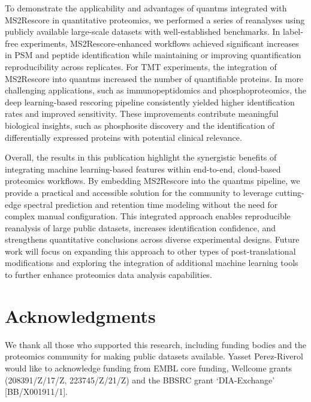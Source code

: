 \documentclass[12pt]{article}
\begin{document}
To demonstrate the applicability and advantages of quantms integrated with MS2Rescore in quantitative proteomics, we performed a series of reanalyses using publicly available large-scale datasets with well-established benchmarks. In label-free experiments, MS2Rescore-enhanced workflows achieved significant increases in PSM and peptide identification while maintaining or improving quantification reproducibility across replicates. For TMT experiments, the integration of MS2Rescore into quantms increased the number of quantifiable proteins. In more challenging applications, such as immunopeptidomics and phosphoproteomics, the deep learning-based rescoring pipeline consistently yielded higher identification rates and improved sensitivity. These improvements contribute meaningful biological insights, such as phosphosite discovery and the identification of differentially expressed proteins with potential clinical relevance.

Overall, the results in this publication highlight the synergistic benefits of integrating machine learning-based features within end-to-end, cloud-based proteomics workflows. By embedding MS2Rescore into the quantms pipeline, we provide a practical and accessible solution for the community to leverage cutting-edge spectral prediction and retention time modeling without the need for complex manual configuration. This integrated approach enables reproducible reanalysis of large public datasets, increases identification confidence, and strengthens quantitative conclusions across diverse experimental designs. Future work will focus on expanding this approach to other types of post-translational modifications and exploring the integration of additional machine learning tools to further enhance proteomics data analysis capabilities.

\section*{Acknowledgments}
We thank all those who supported this research, including funding bodies and the proteomics community for making public datasets available. 
Yasset Perez-Riverol would like to acknowledge funding from EMBL core funding, Wellcome grants (208391/Z/17/Z, 223745/Z/21/Z) and the BBSRC grant ‘DIA-Exchange’ [BB/X001911/1].


\renewcommand\thefigure{S\arabic{figure}}
\setcounter{figure}{0}
\end{document}
